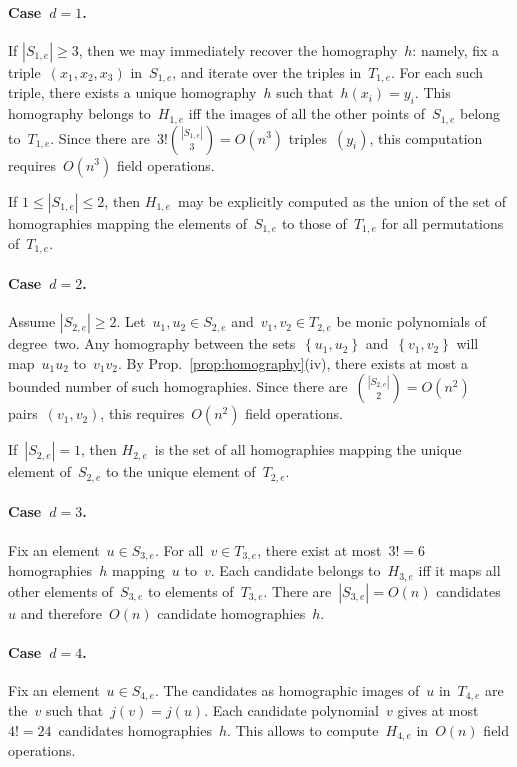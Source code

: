\documentclass{article}%
\def\acco#1{\left\{#1\right\}}
\def\abs#1{\left|#1\right|}
\def\card#1{\abs{#1}}
\begin{document}
\paragraph{Case~$d = 1$.}
If $\card{S_{1,e}} ≥ 3$, then we may immediately recover the
homography~$h$: namely, fix a triple~$(x_1,x_2,x_3)$ in~$S_{1,e}$, and
iterate over the triples in~$T_{1,e}$. For each such triple, there exists
a unique homography~$h$ such that~$h(x_i) = y_i$. This homography belongs
to~$H_{1,e}$ iff the images of all the other points of~$S_{1,e}$ belong
to~$T_{1,e}$. Since there are~$3!\binom{\card{S_{1,e}}}{3} = O(n^3)$
triples~$(y_i)$, this computation requires~$O(n^3)$ field operations.

If $1 ≤ \card{S_{1,e}} ≤ 2$, then $H_{1,e}$~may be explicitly computed as
the union of the set of homographies mapping the elements of~$S_{1,e}$ to
those of~$T_{1,e}$ for all permutations of~$T_{1,e}$.

\paragraph{Case~$d = 2$.}
Assume $\card{S_{2,e}} ≥ 2$. Let~$u_1, u_2 ∈ S_{2,e}$ and~$v_1, v_2 ∈
T_{2,e}$ be monic polynomials of degree~two. Any homography between the
sets~$\acco{u_1, u_2}$ and~$\acco{v_1, v_2}$ will map~$u_1 u_2$ to~$v_1
v_2$. By Prop.~\ref{prop:homography}(iv), there exists at most a bounded
number of such homographies. Since there are~$\binom{\card{S_{2,e}}}{2} =
O(n^2)$ pairs~$(v_1, v_2)$, this requires~$O(n^2)$ field operations.

If~$\card{S_{2,e}} = 1$, then $H_{2,e}$~is the set of all homographies
mapping the unique element of~$S_{2,e}$ to the unique element
of~$T_{2,e}$.

\paragraph{Case~$d = 3$.}
Fix an element~$u ∈ S_{3,e}$. For all~$v ∈ T_{3,e}$, there exist at
most~$3! = 6$ homographies~$h$ mapping~$u$ to~$v$. Each candidate belongs
to~$H_{3,e}$ iff it maps all other elements of~$S_{3,e}$ to elements
of~$T_{3,e}$. There are~$\card{S_{3,e}} = O(n)$ candidates~$u$ and
therefore~$O(n)$ candidate homographies~$h$.

\paragraph{Case~$d = 4$.}
Fix an element~$u ∈ S_{4,e}$. The candidates as homographic images of~$u$
in~$T_{4,e}$ are the~$v$ such that~$j(v) = j(u)$. Each candidate
polynomial~$v$ gives at most $4! = 24$~candidates homographies~$h$. This
allows to compute~$H_{4,e}$ in~$O(n)$ field operations.
\end{document}
